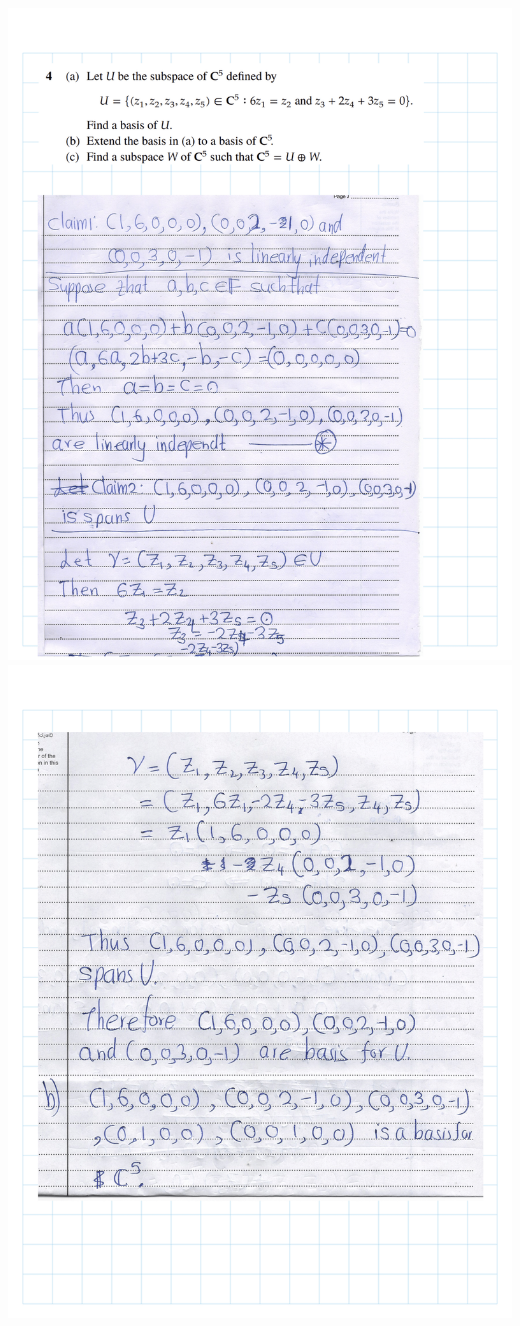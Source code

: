 \documentclass[
]{book}
\theoremstyle{definition}
\theoremstyle{definition}
\theoremstyle{definition}
\theoremstyle{definition}
\theoremstyle{remark}
\begin{document}
\includegraphics{fig/Ex 2B and 2C/EX2B (9).png}
\includegraphics{fig/Ex 2B and 2C/EX2B (10).png}
\end{document}
